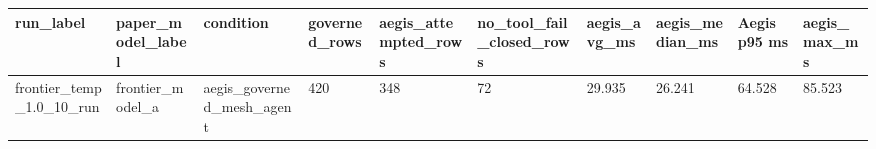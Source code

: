 \begin{tabular}{llllllllll}
 \hline
run\_label & paper\_model\_label & condition & governed\_rows & aegis\_attempted\_rows & no\_tool\_fail\_closed\_rows & aegis\_avg\_ms & aegis\_median\_ms & Aegis p95 ms & aegis\_max\_ms \\
 \hline
frontier\_temp\_1.0\_10\_run & frontier\_model\_a & aegis\_governed\_mesh\_agent & 420 & 348 & 72 & 29.935 & 26.241 & 64.528 & 85.523 \\
 \hline
\end{tabular}
